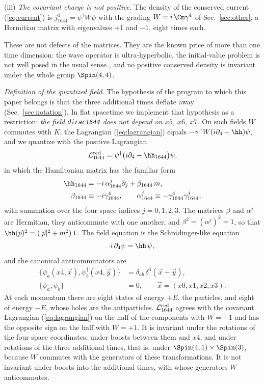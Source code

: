 (iii) \emph{The covariant charge is not positive.} The density of the conserved current
(\ref{eq:current}) is $j_{1644}^4=\psi^\dagger W\psi$ with the grading $W=i\,\Cm\gamma^4$ of
Sec.~\ref{sec:other}, a Hermitian matrix with eigenvalues $+1$ and $-1$, eight times each.

These are not defects of the matrices. They are the known price of more than one time dimension: the
wave operator is ultra-hyperbolic, the initial-value problem is not well posed in the usual sense
\cite{Tegmark1997,CraigWeinstein2009}, and no positive conserved density is invariant under the whole
group $\Spin(4,4)$.

\emph{Definition of the quantized field.} The hypothesis of the program to which this paper belongs
is that the three additional times deflate away (Sec.~\ref{sec:notation}). In flat spacetime we
implement that hypothesis as a restriction: \emph{the field \texttt{dirac1644} does not depend on
$x5$, $x6$, $x7$.} On such fields $W$ commutes with $K$, the Lagrangian (\ref{eq:lagrangian}) equals
$-\psi^\dagger W(i\partial_4-\hh)\psi$, and we quantize with the positive Lagrangian
\begin{equation}
\mathcal{L}^{\rm red}_{1644}=\psi^\dagger\big(i\partial_4-\hh_{1644}\big)\psi,
\label{eq:Lred}
\end{equation}
in which the Hamiltonian matrix has the familiar form
\begin{align}
\hh_{1644}&=-i\,\alpha_{1644}^j\partial_j+\beta_{1644}\,m,\nonumber\\
\beta_{1644}&\equiv-i\gamma_{1644}^4,\qquad\alpha_{1644}^j\equiv-\gamma_{1644}^4\gamma_{1644}^j,
\label{eq:hamiltonian}
\end{align}
with summation over the four space indices $j=0,1,2,3$. The matrices $\beta$ and $\alpha^j$ are
Hermitian, they anticommute with one another, and $\beta^2=(\alpha^j)^2=1$, so that
$\hh(\vec p)^2=(|\vec p|^2+m^2)\,1$. The field equation is the Schr\"odinger-like equation
\begin{equation}
i\,\partial_4\psi=\hh\,\psi,
\label{eq:schroedinger}
\end{equation}
and the canonical anticommutators are
\begin{align}
\{\psi_a(x4,\vec x),\psi_b^\dagger(x4,\vec y)\}&=\delta_{ab}\,\delta^4(\vec x-\vec y),\nonumber\\
\{\psi_a,\psi_b\}&=0,\qquad\vec x=(x0,x1,x2,x3).
\label{eq:car}
\end{align}
At each momentum there are eight states of energy $+E$, the particles, and eight of energy $-E$, whose
holes are the antiparticles. $\mathcal{L}^{\rm red}_{1644}$ agrees with the covariant Lagrangian
(\ref{eq:lagrangian}) on the half of the components with $W=-1$ and has the opposite sign on the
half with $W=+1$. It is invariant under the rotations of the four space coordinates, under boosts
between them and $x4$, and under rotations of the three additional times, that is, under
$\Spin(4,1)\times\Spin(3)$, because $W$ commutes with the generators of these transformations. It is
not invariant under boosts into the additional times, with whose generators $W$ anticommutes.

